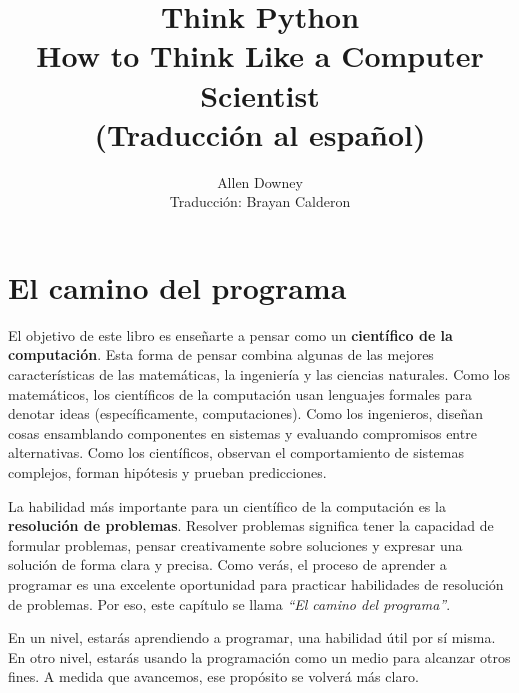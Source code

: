 \documentclass[12pt,letterpaper]{book}
\title{Think Python\\
    How to Think Like a Computer Scientist\\ (Traducción al español)}
\author{Allen Downey\\\small Traducción: Brayan Calderon}
\date{}
\begin{document}
\maketitle
\frontmatter

%
%


\mainmatter

\chapter{El camino del programa}

El objetivo de este libro es enseñarte a pensar como un \textbf{científico de la computación}. Esta forma de pensar combina algunas de las mejores características de las matemáticas, la ingeniería y las ciencias naturales. Como los matemáticos, los científicos de la computación usan lenguajes formales para denotar ideas (específicamente, computaciones). 
Como los ingenieros, diseñan cosas ensamblando componentes en sistemas y evaluando compromisos entre alternativas. Como los científicos, observan el comportamiento de sistemas complejos, forman hipótesis y prueban predicciones.

La habilidad más importante para un científico de la computación es la \textbf{resolución de problemas}. Resolver problemas significa tener la capacidad de formular problemas, pensar creativamente sobre soluciones y expresar una solución de forma clara y precisa. Como verás, el proceso de aprender a programar es una excelente oportunidad para practicar habilidades de resolución de problemas. Por eso, este capítulo se llama \emph{“El camino del programa”}.

En un nivel, estarás aprendiendo a programar, una habilidad útil por sí misma. En otro nivel, estarás usando la programación como un medio para alcanzar otros fines. A medida que avancemos, ese propósito se volverá más claro.
\end{document}
